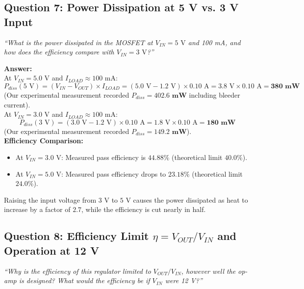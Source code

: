 \documentclass[11pt,a4paper]{article}
\begin{document}
\subsection{Question 7: Power Dissipation at 5 V vs. 3 V Input}
\textit{``What is the power dissipated in the MOSFET at $V_{IN} = 5\text{ V}$ and 100 mA, and how does the efficiency compare with $V_{IN} = 3\text{ V}$?''}

\textbf{Answer:}\\
At $V_{IN} = 5.0\text{ V}$ and $I_{LOAD} \approx 100\text{ mA}$:
\begin{equation}
    P_{diss}(5\text{ V}) = (V_{IN} - V_{OUT}) \times I_{LOAD} = (5.0\text{ V} - 1.2\text{ V}) \times 0.10\text{ A} = 3.8\text{ V} \times 0.10\text{ A} = \mathbf{380\text{ mW}}
\end{equation}
(Our experimental measurement recorded $P_{diss} = \mathbf{402.6\text{ mW}}$ including bleeder current).\\
At $V_{IN} = 3.0\text{ V}$ and $I_{LOAD} \approx 100\text{ mA}$:
\begin{equation}
    P_{diss}(3\text{ V}) = (3.0\text{ V} - 1.2\text{ V}) \times 0.10\text{ A} = 1.8\text{ V} \times 0.10\text{ A} = \mathbf{180\text{ mW}}
\end{equation}
(Our experimental measurement recorded $P_{diss} = \mathbf{149.2\text{ mW}}$).\\
\textbf{Efficiency Comparison:}\\
\begin{itemize}
    \item At $V_{IN} = 3.0\text{ V}$: Measured pass efficiency is $\mathbf{44.88\%}$ (theoretical limit $40.0\%$).
    \item At $V_{IN} = 5.0\text{ V}$: Measured pass efficiency drops to $\mathbf{23.18\%}$ (theoretical limit $24.0\%$).
\end{itemize}
Raising the input voltage from $3\text{ V}$ to $5\text{ V}$ causes the power dissipated as heat to increase by a factor of $2.7$, while the efficiency is cut nearly in half.

\subsection{Question 8: Efficiency Limit \texorpdfstring{$\eta = V_{OUT}/V_{IN}$}{eta = V\_OUT/V\_IN} and Operation at 12 V}
\textit{``Why is the efficiency of this regulator limited to $V_{OUT} / V_{IN}$, however well the op-amp is designed? What would the efficiency be if $V_{IN}$ were 12 V?''}
\end{document}
